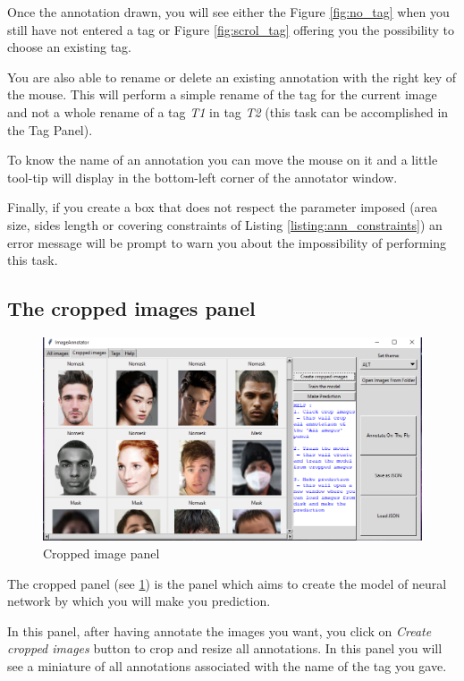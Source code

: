 \documentclass[a4paper,12pt]{article}
\begin{document}
Once the annotation drawn, you will see either the Figure \ref{fig:no_tag} when you still have not entered a tag or Figure \ref{fig:scrol_tag} offering you the possibility to choose an existing tag.

You are also able to rename or delete an existing annotation with the right key of the mouse. 
This will perform a simple rename of the tag for the current image and not a whole rename of a tag \textit{T1} in tag \textit{T2} (this task can be accomplished in the Tag Panel).

To know the name of an annotation you can move the mouse on it and a little tool-tip will display in the bottom-left corner of the annotator window.

Finally, if you create a box that does not respect the parameter imposed (area size, sides length or covering constraints of Listing \ref{listing:ann_constraints}) an error message will be prompt to warn you about the impossibility of performing this task.

\subsection{The cropped images panel}

\begin{figure}
    \centering
    \includegraphics[width=1.0\textwidth]{Cropped_images.png}
    \caption{Cropped image panel}
    \label{fig:cropped_img_panel}
\end{figure}

The cropped panel (see \ref{fig:cropped_img_panel}) is the panel which aims to create the model of neural network by which you will make you prediction.

In this panel, after having annotate the images you want, you click on \textit{Create cropped images} button to crop and resize all annotations. In this panel you will see a miniature of all annotations associated with the name of the tag you gave.
\end{document}
